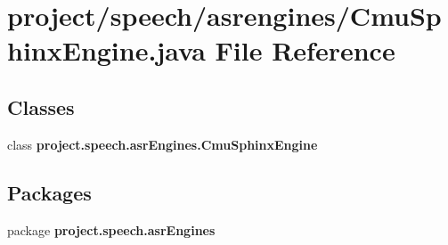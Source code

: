 \section{project/speech/asrengines/\+Cmu\+Sphinx\+Engine.java File Reference}
\label{_cmu_sphinx_engine_8java}
\subsection*{Classes}
\begin{DoxyCompactItemize}
\item 
class {\bf project.\+speech.\+asr\+Engines.\+Cmu\+Sphinx\+Engine}
\end{DoxyCompactItemize}
\subsection*{Packages}
\begin{DoxyCompactItemize}
\item 
package {\bf project.\+speech.\+asr\+Engines}
\end{DoxyCompactItemize}
